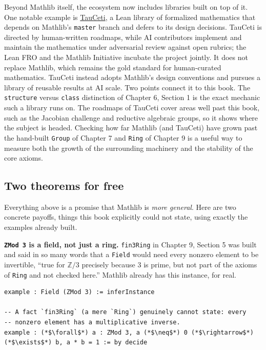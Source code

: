 Beyond Mathlib itself, the ecosystem now includes libraries built on top of it. One notable example is \href{https://github.com/TauCetiProject/TauCeti}{TauCeti}, a Lean library of formalized mathematics that depends on Mathlib's \texttt{master} branch and defers to its design decisions. TauCeti is directed by human-written roadmaps, while AI contributors implement and maintain the mathematics under adversarial review against open rubrics; the Lean FRO and the Mathlib Initiative incubate the project jointly. It does not replace Mathlib, which remains the gold standard for human-curated mathematics. TauCeti instead adopts Mathlib's design conventions and pursues a library of reusable results at AI scale. Two points connect it to this book. The \texttt{structure} versus \texttt{class} distinction of Chapter 6, Section 1 is the exact mechanic such a library runs on. The roadmaps of TauCeti cover areas well past this book, such as the Jacobian challenge and reductive algebraic groups, so it shows where the subject is headed. Checking how far Mathlib (and TauCeti) have grown past the hand-built \texttt{Group} of Chapter 7 and \texttt{Ring} of Chapter 9 is a useful way to measure both the growth of the surrounding machinery and the stability of the core axioms.

\subsection{Two theorems for free}\label{sec:14-next-steps:02-moving-to-mathlib:2}

Everything above is a promise that Mathlib is \emph{more general}. Here are two concrete payoffs, things this book explicitly could not state, using exactly the examples already built.

\textbf{\texttt{ZMod 3} is a field, not just a ring.} \texttt{fin3Ring} in Chapter 9, Section 5 was built and said in so many words that a \texttt{Field} would need every nonzero element to be invertible, ``true for \(\mathbb{Z}/3\) precisely because \(3\) is prime, but not part of the axioms of \texttt{Ring} and not checked here.'' Mathlib already has this instance, for real.

\begin{lstlisting}
example : Field (ZMod 3) := inferInstance

-- A fact `fin3Ring` (a mere `Ring`) genuinely cannot state: every
-- nonzero element has a multiplicative inverse.
example : (*$\forall$*) a : ZMod 3, a (*$\neq$*) 0 (*$\rightarrow$*) (*$\exists$*) b, a * b = 1 := by decide
\end{lstlisting}

